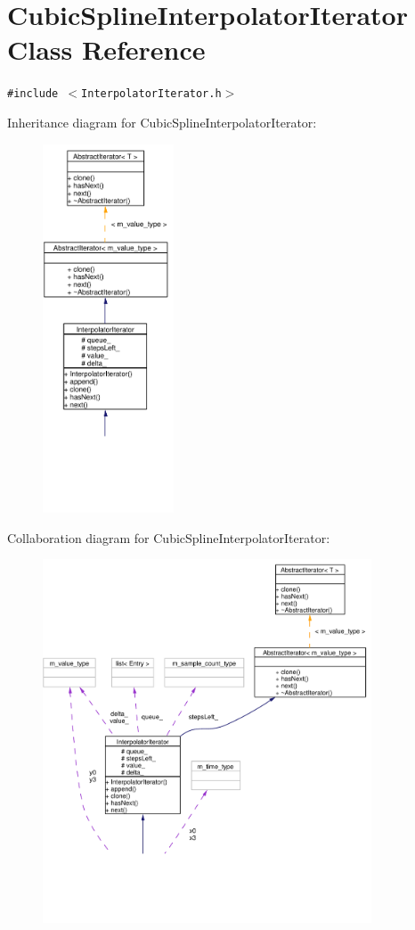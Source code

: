 \hypertarget{classCubicSplineInterpolatorIterator}{
\section{Cubic\-Spline\-Interpolator\-Iterator Class Reference}
\label{classCubicSplineInterpolatorIterator}
}
{\tt \#include $<$Interpolator\-Iterator.h$>$}

Inheritance diagram for Cubic\-Spline\-Interpolator\-Iterator:\begin{figure}[H]
\begin{center}
\leavevmode
\includegraphics[width=110pt]{classCubicSplineInterpolatorIterator__inherit__graph}
\end{center}
\end{figure}
Collaboration diagram for Cubic\-Spline\-Interpolator\-Iterator:\begin{figure}[H]
\begin{center}
\leavevmode
\includegraphics[width=277pt]{classCubicSplineInterpolatorIterator__coll__graph}
\end{center}
\end{figure}
